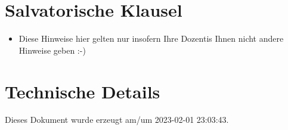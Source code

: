 \documentclass[
  a4paper,
  DIV=11]{scrreprt}
\providecommand{\tightlist}{%
  \setlength{\itemsep}{0pt}\setlength{\parskip}{0pt}}\usepackage{longtable,booktabs,array}
\theoremstyle{definition}
\theoremstyle{definition}
\theoremstyle{remark}
\begin{document}
\hypertarget{salvatorische-klausel}{%
\section*{Salvatorische Klausel}\label{salvatorische-klausel}}


\begin{itemize}
\tightlist
\item
  Diese Hinweise hier gelten nur insofern Ihre Dozentis Ihnen nicht
  andere Hinweise geben :-)
\end{itemize}

\hypertarget{technische-details}{%
\section*{Technische Details}\label{technische-details}}


Dieses Dokument wurde erzeugt am/um 2023-02-01 23:03:43.
\end{document}
